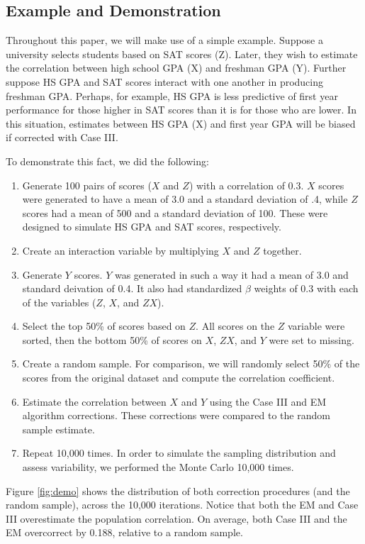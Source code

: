 \documentclass[doc, babel,english]{apa}%
\begin{document}
\subsection{Example and Demonstration}

Throughout this paper, we will make use of a simple example. Suppose a university selects students based on SAT scores (Z). Later, they wish to estimate the correlation between high school GPA (X) and freshman GPA (Y). Further suppose HS GPA and SAT scores interact with one another in producing freshman GPA. Perhaps, for example, HS GPA is less predictive of first year performance for those higher in SAT scores than it is for those who are lower. In this situation, estimates between HS GPA (X) and first year GPA will be biased if corrected with Case III.

To demonstrate this fact, we did the following:

\begin{enumerate}
\item Generate 100 pairs of scores ($X$ and $Z$) with a correlation of 0.3. $X$ scores were generated to have a mean of 3.0 and a standard deviation of .4, while $Z$ scores had a mean of 500 and a standard deviation of 100. These were designed to simulate HS GPA and SAT scores, respectively. 
\item Create an interaction variable by multiplying $X$ and $Z$ together.
\item Generate $Y$ scores. $Y$ was generated in such a way it had a mean of 3.0 and standard deivation of 0.4. It also had standardized $\beta$ weights of 0.3 with each of the variables ($Z$, $X$, and $ZX$).  
\item Select the top 50\% of scores based on $Z$. All scores on the $Z$ variable were sorted, then the bottom 50\% of scores on $X$, $ZX$, and $Y$ were set to missing.
\item Create a random sample. For comparison, we will randomly select 50\% of the scores from the original dataset and compute the correlation coefficient. 
\item Estimate the correlation between $X$ and $Y$ using the Case III and EM algorithm corrections. These corrections were compared to the random sample estimate.
\item Repeat 10,000 times. In order to simulate the sampling distribution and assess variability, we performed the Monte Carlo 10,000 times. 
\end{enumerate}

Figure \ref{fig:demo} shows the distribution of both correction procedures (and the random sample), across the 10,000 iterations. Notice that both the EM and Case III overestimate the population correlation. On average, both Case III and the EM overcorrect by 0.188, relative to a random sample. 
\end{document}
